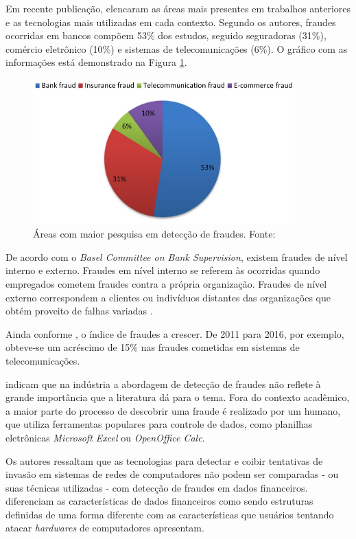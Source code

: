 \documentclass[smallextended]{svjour3}
\begin{document}
Em recente publicação, \cite{Abdallah2016} elencaram as áreas mais presentes em trabalhos anteriores e as tecnologias mais utilizadas em cada contexto. Segundo os autores, fraudes ocorridas em bancos compõem 53\% dos estudos, seguido seguradoras (31\%), comércio eletrônico (10\%) e sistemas de telecomunicações (6\%). O gráfico com as informações está demonstrado na Figura \ref{fig:fraudespopulares}. 

\begin{figure}[!ht]
	\centering
	\includegraphics[width=0.9\textwidth]{imagens/fraudespopulares.jpg}
	\caption{Áreas com maior pesquisa em detecção de fraudes. Fonte: \cite{Abdallah2016}}
	\label{fig:fraudespopulares}
\end{figure}

De acordo com o \emph{Basel Committee on Bank Supervision}, existem fraudes de nível interno e externo. Fraudes em nível interno se referem às ocorridas quando empregados cometem fraudes contra a própria organização. Fraudes de nível externo correspondem a clientes ou indivíduos distantes das organizações que obtém proveito de falhas variadas \citep{Abdallah2016}.

Ainda conforme \cite{Abdallah2016}, o índice de fraudes a crescer. De 2011 para 2016, por exemplo, obteve-se um acréscimo de 15\% nas fraudes cometidas em sistemas de telecomunicações.

\cite{Flegel2010} indicam que na indústria a abordagem de detecção de fraudes não reflete à grande importância que a literatura dá para o tema. Fora do contexto acadêmico, a maior parte do processo de descobrir uma fraude é realizado por um humano, que utiliza ferramentas populares para controle de dados, como planilhas eletrônicas \emph{Microsoft Excel} ou \emph{OpenOffice Calc}. 

Os autores ressaltam que as tecnologias para detectar e coibir tentativas de invasão em sistemas de redes de computadores não podem ser comparadas - ou suas técnicas utilizadas - com detecção de fraudes em dados financeiros. \cite{Flegel2010} diferenciam as características de dados financeiros como sendo estruturas definidas de uma forma diferente com as características que usuários tentando atacar \emph{hardwares} de computadores apresentam.
\end{document}
